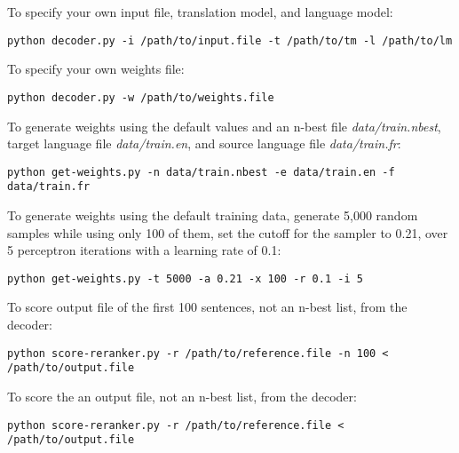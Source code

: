 \documentclass[letterpaper]{article}
\begin{document}
\noindent To specify your own input file, translation model, and language model:
\begin{lstlisting}[frame=single]
python decoder.py -i /path/to/input.file -t /path/to/tm -l /path/to/lm
\end{lstlisting}

\noindent To specify your own weights file:
\begin{lstlisting}[frame=single]
python decoder.py -w /path/to/weights.file
\end{lstlisting}

\noindent To generate weights using the default values and an n-best file \textit{data/train.nbest}, target language file \textit{data/train.en}, and source language file \textit{data/train.fr}:
\begin{lstlisting}[frame=single]
python get-weights.py -n data/train.nbest -e data/train.en -f data/train.fr
\end{lstlisting}

\noindent To generate weights using the default training data, generate 5,000 random samples while using only 100 of them, set the cutoff for the sampler to 0.21, over 5 perceptron iterations with a learning rate of 0.1:
\begin{lstlisting}[frame=single]
python get-weights.py -t 5000 -a 0.21 -x 100 -r 0.1 -i 5
\end{lstlisting}

\noindent To score output file of the first 100 sentences, not an n-best list, from the decoder:
\begin{lstlisting}[frame=single]
python score-reranker.py -r /path/to/reference.file -n 100 < /path/to/output.file
\end{lstlisting}

\noindent To score the an output file, not an n-best list, from the decoder:
\begin{lstlisting}[frame=single]
python score-reranker.py -r /path/to/reference.file < /path/to/output.file
\end{lstlisting}
\end{document}

